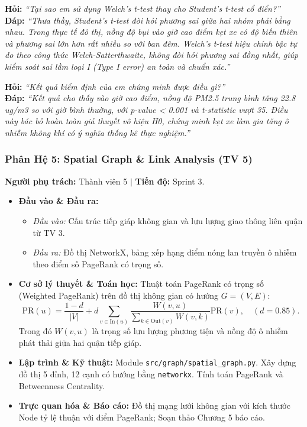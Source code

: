 \documentclass[11pt,a4paper]{article}
\begin{document}
\begin{tcolorbox}[colback=blue!5!white, colframe=blue!60!black, fonttitle=\bfseries\color{white}, title={BỘ CÂU HỎI VẤN ĐÁP TRỌNG TÂM DÀNH CHO TV 4}]
\textbf{Hỏi:} \textit{“Tại sao em sử dụng Welch's t-test thay cho Student's t-test cổ điển?”}\\
\textbf{Đáp:} \textit{“Thưa thầy, Student's t-test đòi hỏi phương sai giữa hai nhóm phải bằng nhau. Trong thực tế đô thị, nồng độ bụi vào giờ cao điểm kẹt xe có độ biến thiên và phương sai lớn hơn rất nhiều so với ban đêm. Welch's t-test hiệu chỉnh bậc tự do theo công thức Welch-Satterthwaite, không đòi hỏi phương sai đồng nhất, giúp kiểm soát sai lầm loại I (Type I error) an toàn và chuẩn xác.”}

\textbf{Hỏi:} \textit{“Kết quả kiểm định của em chứng minh được điều gì?”}\\
\textbf{Đáp:} \textit{“Kết quả cho thấy vào giờ cao điểm, nồng độ PM2.5 trung bình tăng 22.8 ug/m3 so với giờ bình thường, với p-value < 0.001 và t-statistic vượt 35. Điều này bác bỏ hoàn toàn giả thuyết vô hiệu H0, chứng minh kẹt xe làm gia tăng ô nhiễm không khí có ý nghĩa thống kê thực nghiệm.”}
\end{tcolorbox}

\subsubsection{Phân Hệ 5: Spatial Graph \& Link Analysis (TV 5)}
\textbf{Người phụ trách:} Thành viên 5 \quad $\vert$ \quad \textbf{Tiến độ:} Sprint 3.
\begin{itemize}[leftmargin=*]
    \item \textbf{Đầu vào \& Đầu ra:}
    \begin{itemize}
        \item \textit{Đầu vào:} Cấu trúc tiếp giáp không gian và lưu lượng giao thông liên quận từ TV 3.
        \item \textit{Đầu ra:} Đồ thị NetworkX, bảng xếp hạng điểm nóng lan truyền ô nhiễm theo điểm số PageRank có trọng số.
    \end{itemize}
    \item \textbf{Cơ sở lý thuyết \& Toán học:}
    Thuật toán PageRank có trọng số (Weighted PageRank) trên đồ thị không gian có hướng $G=(V, E)$:
    \begin{equation}
        \text{PR}(u) = \frac{1-d}{|V|} + d \sum_{v \in \text{In}(u)} \frac{W(v, u)}{\sum_{k \in \text{Out}(v)} W(v, k)} \text{PR}(v), \quad (d = 0.85).
    \end{equation}
    Trong đó $W(v, u)$ là trọng số lưu lượng phương tiện và nồng độ ô nhiễm phát thải giữa hai quận tiếp giáp.
    \item \textbf{Lập trình \& Kỹ thuật:} Module \texttt{src/graph/spatial\_graph.py}. Xây dựng đồ thị 5 đỉnh, 12 cạnh có hướng bằng \texttt{networkx}. Tính toán PageRank và Betweenness Centrality.
    \item \textbf{Trực quan hóa \& Báo cáo:} Đồ thị mạng lưới không gian với kích thước Node tỷ lệ thuận với điểm PageRank; Soạn thảo Chương 5 báo cáo.
\end{itemize}
\end{document}
